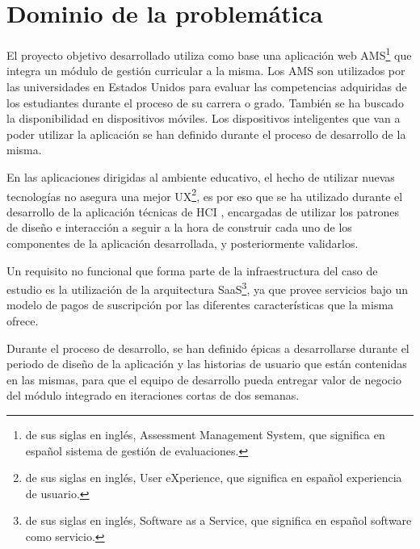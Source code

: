 \section{Dominio de la problemática}
El proyecto objetivo desarrollado utiliza como base una aplicación web AMS\footnote{de sus siglas en inglés, Assessment Management System, que significa en español sistema de gestión de evaluaciones.} que integra un módulo de gestión curricular a la misma. Los AMS son utilizados por las universidades en Estados Unidos para evaluar las competencias adquiridas de los estudiantes durante el proceso de su carrera o grado. También se ha buscado la disponibilidad en dispositivos móviles. Los dispositivos inteligentes que van a poder utilizar la aplicación se han definido durante el proceso de desarrollo de la misma.

En las aplicaciones dirigidas al ambiente educativo, el hecho de utilizar nuevas tecnologías no asegura una mejor UX\footnote{de sus siglas en inglés, User eXperience, que significa en español experiencia de usuario.}, es por eso que se ha utilizado durante el desarrollo de la aplicación técnicas de HCI \citep{lazar_research_2010}, encargadas de utilizar los patrones de diseño e interacción a seguir a la hora de construir cada uno de los componentes de la aplicación desarrollada, y posteriormente validarlos.

Un requisito no funcional que forma parte de la infraestructura del caso de estudio es la utilización de la arquitectura SaaS\footnote{de sus siglas en inglés, Software as a Service, que significa en español software como servicio.}, ya que provee servicios bajo un modelo de pagos de suscripción por las diferentes características que la misma ofrece.

Durante el proceso de desarrollo, se han definido épicas a desarrollarse durante el periodo de diseño de la aplicación y las historias de usuario que están contenidas en las mismas, para que el equipo de desarrollo pueda entregar valor de negocio del módulo integrado en iteraciones cortas de dos semanas.